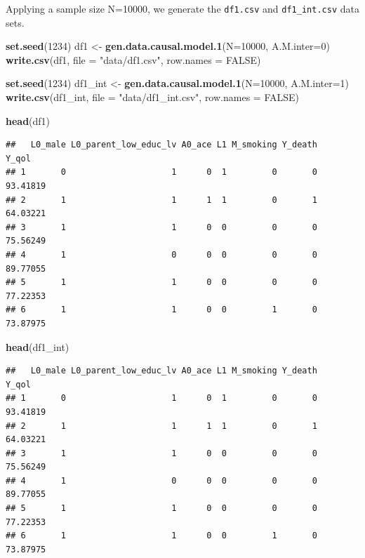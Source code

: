 \documentclass[
]{book}
\newenvironment{Shaded}{\begin{snugshade}}{\end{snugshade}}
\newcommand{\AttributeTok}[1]{\textcolor[rgb]{0.13,0.29,0.53}{#1}}
\newcommand{\ConstantTok}[1]{\textcolor[rgb]{0.56,0.35,0.01}{#1}}
\newcommand{\DecValTok}[1]{\textcolor[rgb]{0.00,0.00,0.81}{#1}}
\newcommand{\FunctionTok}[1]{\textcolor[rgb]{0.13,0.29,0.53}{\textbf{#1}}}
\newcommand{\NormalTok}[1]{#1}
\newcommand{\OtherTok}[1]{\textcolor[rgb]{0.56,0.35,0.01}{#1}}
\newcommand{\StringTok}[1]{\textcolor[rgb]{0.31,0.60,0.02}{#1}}
\begin{document}
Applying a sample size N=10000, we generate the \texttt{df1.csv} and \texttt{df1\_int.csv} data sets.

\begin{Shaded}
\begin{Highlighting}[]
\FunctionTok{set.seed}\NormalTok{(}\DecValTok{1234}\NormalTok{)}
\NormalTok{df1 }\OtherTok{\textless{}{-}} \FunctionTok{gen.data.causal.model.1}\NormalTok{(}\AttributeTok{N=}\DecValTok{10000}\NormalTok{, }\AttributeTok{A.M.inter=}\DecValTok{0}\NormalTok{)}
\FunctionTok{write.csv}\NormalTok{(df1, }\AttributeTok{file =} \StringTok{"data/df1.csv"}\NormalTok{, }\AttributeTok{row.names =} \ConstantTok{FALSE}\NormalTok{)}

\FunctionTok{set.seed}\NormalTok{(}\DecValTok{1234}\NormalTok{)}
\NormalTok{df1\_int }\OtherTok{\textless{}{-}} \FunctionTok{gen.data.causal.model.1}\NormalTok{(}\AttributeTok{N=}\DecValTok{10000}\NormalTok{, }\AttributeTok{A.M.inter=}\DecValTok{1}\NormalTok{)}
\FunctionTok{write.csv}\NormalTok{(df1\_int, }\AttributeTok{file =} \StringTok{"data/df1\_int.csv"}\NormalTok{, }\AttributeTok{row.names =} \ConstantTok{FALSE}\NormalTok{)}
\end{Highlighting}
\end{Shaded}

\begin{Shaded}
\begin{Highlighting}[]
\FunctionTok{head}\NormalTok{(df1)}
\end{Highlighting}
\end{Shaded}

\begin{verbatim}
##   L0_male L0_parent_low_educ_lv A0_ace L1 M_smoking Y_death    Y_qol
## 1       0                     1      0  1         0       0 93.41819
## 2       1                     1      1  1         0       1 64.03221
## 3       1                     1      0  0         0       0 75.56249
## 4       1                     0      0  0         0       0 89.77055
## 5       1                     1      0  0         0       0 77.22353
## 6       1                     1      0  0         1       0 73.87975
\end{verbatim}

\begin{Shaded}
\begin{Highlighting}[]
\FunctionTok{head}\NormalTok{(df1\_int)}
\end{Highlighting}
\end{Shaded}

\begin{verbatim}
##   L0_male L0_parent_low_educ_lv A0_ace L1 M_smoking Y_death    Y_qol
## 1       0                     1      0  1         0       0 93.41819
## 2       1                     1      1  1         0       1 64.03221
## 3       1                     1      0  0         0       0 75.56249
## 4       1                     0      0  0         0       0 89.77055
## 5       1                     1      0  0         0       0 77.22353
## 6       1                     1      0  0         1       0 73.87975
\end{verbatim}
\end{document}

